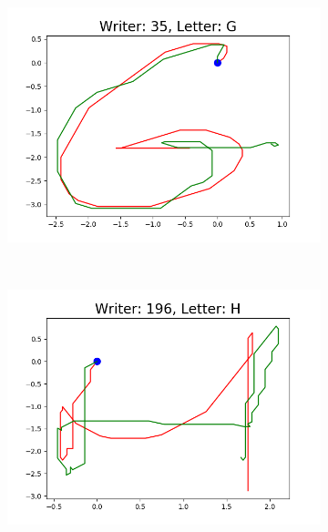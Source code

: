 \begin{figure}
\begin{subfigure}[b]{0.17\textwidth}
          \includegraphics[width=\textwidth]{images/framework/comparison_figures/G_35.png}
      \end{subfigure}
      ~
      \begin{subfigure}[b]{0.17\textwidth}
          \includegraphics[width=\textwidth]{images/framework/comparison_figures/H_196.png}
      \end{subfigure}
      ~
      \begin{subfigure}[b]{0.17\textwidth}

\end{subfigure}
\end{figure}

